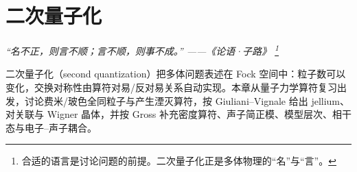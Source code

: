 \chapter{二次量子化}
\renewcommand{\currentchapterpath}{chapters/ch02/}

\begin{flushright}
\textit{“名不正，则言不顺；言不顺，则事不成。” ——《论语·子路》
\footnote{合适的语言是讨论问题的前提。二次量子化正是多体物理的“名”与“言”。}}
\end{flushright}

二次量子化（second quantization）把多体问题表述在 Fock 空间中：粒子数可以变化，交换对称性由算符对易/反对易关系自动实现。本章从量子力学算符复习出发，讨论费米/玻色全同粒子与产生湮灭算符，按 Giuliani--Vignale 给出 jellium、对关联与 Wigner 晶体，并按 Gross 补充密度算符、声子简正模、模型层次、相干态与电子–声子耦合。


